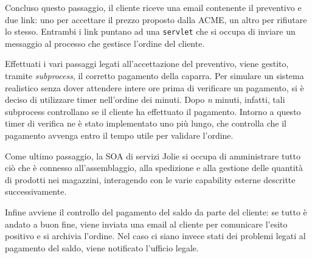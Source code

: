 Concluso questo passaggio, il cliente riceve una email contenente il
preventivo e due link: uno per accettare il prezzo proposto dalla ACME,
un altro per rifiutare lo stesso.
Entrambi i link puntano ad una {\tt servlet} che si occupa di inviare un
messaggio al processo che gestisce l'ordine del cliente.

Effettuati i vari passaggi legati all'accettazione del preventivo, viene
gestito, tramite \textit{subprocess}, il corretto pagamento della
caparra. Per simulare un sistema realistico senza dover attendere intere
ore prima di verificare un pagamento, si \`e deciso di utilizzare timer
nell'ordine dei minuti.
Dopo \textit{n} minuti, infatti, tali subprocess controllano se il
cliente ha effettuato il pagamento.
Intorno a questo timer di verifica ne \`e stato implementato uno pi\`u
lungo, che controlla che il pagamento avvenga entro il tempo utile per
validare l'ordine.

Come ultimo passaggio, la SOA di servizi Jolie si occupa di amministrare
tutto ci\`o che \`e connesso all'assemblaggio, alla spedizione e alla
gestione delle quantit\`a di prodotti nei magazzini, interagendo con le
varie capability esterne descritte successivamente.

Infine avviene il controllo del pagamento del saldo da parte del
cliente: se tutto \`e andato a buon fine, viene inviata una email al
cliente per comunicare l'esito positivo e si archivia l'ordine. Nel caso
ci siano invece stati dei problemi legati al pagamento del saldo, viene
notificato l'ufficio legale.

